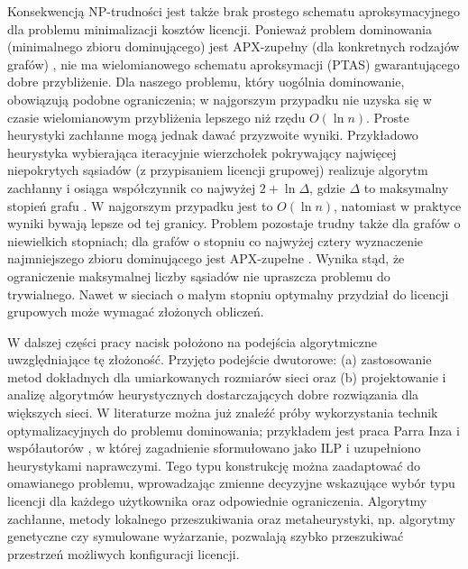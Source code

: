Konsekwencją NP-trudności jest także brak prostego schematu aproksymacyjnego dla problemu minimalizacji kosztów licencji. Ponieważ problem dominowania (minimalnego zbioru dominującego) jest APX-zupełny (dla konkretnych rodzajów grafów) \cite{POUREIDI2023106363}, nie ma wielomianowego schematu aproksymacji (PTAS) gwarantującego dobre przybliżenie. Dla naszego problemu, który uogólnia dominowanie, obowiązują podobne ograniczenia; w najgorszym przypadku nie uzyska się w czasie wielomianowym przybliżenia lepszego niż rzędu $O(\ln n)$. Proste heurystyki zachłanne mogą jednak dawać przyzwoite wyniki. Przykładowo heurystyka wybierająca iteracyjnie wierzchołek pokrywający najwięcej niepokrytych sąsiadów (z przypisaniem licencji grupowej) realizuje algorytm zachłanny i osiąga współczynnik co najwyżej $2+\ln \Delta$, gdzie $\Delta$ to maksymalny stopień grafu \cite{Kuhn2012NetworkAlgorithms}. W najgorszym przypadku jest to $O(\ln n)$, natomiast w praktyce wyniki bywają lepsze od tej granicy. Problem pozostaje trudny także dla grafów o niewielkich stopniach; dla grafów o stopniu co najwyżej cztery wyznaczenie najmniejszego zbioru dominującego jest APX-zupełne \cite{ALIMONTI2000123,POUREIDI2023106363}.
Wynika stąd, że ograniczenie maksymalnej liczby sąsiadów nie upraszcza problemu do trywialnego. Nawet w sieciach o małym stopniu optymalny przydział do licencji grupowych może wymagać złożonych obliczeń.

W dalszej części pracy nacisk położono na podejścia algorytmiczne uwzględniające tę złożoność. Przyjęto podejście dwutorowe: (a) zastosowanie metod dokładnych dla umiarkowanych rozmiarów sieci oraz (b) projektowanie i analizę algorytmów heurystycznych dostarczających dobre rozwiązania dla większych sieci. W literaturze można już znaleźć próby wykorzystania technik optymalizacyjnych do problemu dominowania; przykładem jest praca Parra Inza i współautorów \cite{PARRAINZA2024926}, w której zagadnienie sformułowano jako ILP i uzupełniono heurystykami naprawczymi. Tego typu konstrukcję można zaadaptować do omawianego problemu, wprowadzając zmienne decyzyjne wskazujące wybór typu licencji dla każdego użytkownika oraz odpowiednie ograniczenia. Algorytmy zachłanne, metody lokalnego przeszukiwania oraz metaheurystyki, np. algorytmy genetyczne czy symulowane wyżarzanie, pozwalają szybko przeszukiwać przestrzeń możliwych konfiguracji licencji.
